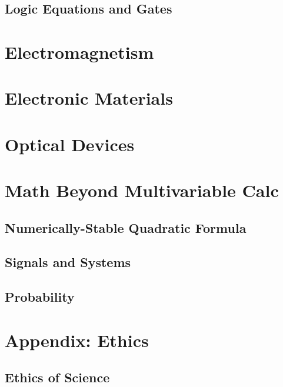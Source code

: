 \documentclass[12pt]{report}
\begin{document}
\section{Logic Equations and Gates}

\newpage
\chapter{Electromagnetism}

\newpage
\chapter{Electronic Materials}

\newpage
\chapter{Optical Devices}

\newpage
\chapter{Math Beyond Multivariable Calc}
\section{Numerically-Stable Quadratic Formula}
\section{Signals and Systems}
\section{Probability}

\newpage
\chapter{Appendix: Ethics}
\section{Ethics of Science}
\end{document}
